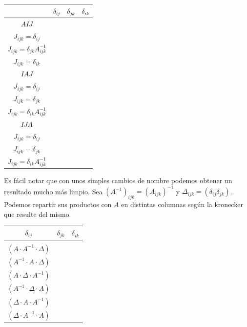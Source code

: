 \documentclass[a4paper, titlepage]{article}
\begin{document}
\begin{tabular}{ |c|c|c|c| } 
	\hline
		  & $\delta_{ij}$      & $\delta_{jk}$       & $\delta_{ik}$ \\
	\hline
	$AIJ$ & \makecell{$I_{ijk} = \delta_{ij} A_{ijk}^{-1}$ \\ $J_{ijk} = \delta_{ij}$}                          & \makecell{$I_{ijk} = \delta_{jk}$ \\ $J_{ijk} = \delta_{jk} A_{ijk}^{-1}$}                          & \makecell{$I_{ijk} = \delta_{ik} \sum\limits^n_{l=1}\delta_{il} A_{lll}^{-1}$ \\ $J_{ijk} = \delta_{ik}$} \\
	\hline
	$IAJ$ & \makecell{$I_{ijk} = \delta_{ij} A_{ijk}^{-1}$ \\ $J_{ijk} = \delta_{ij}$}                          & \makecell{$I_{ijk} = \delta_{jk} \sum\limits^n_{l=1} \delta_{jl} A_{lll}^{-1}$ \\ $J_{ijk} = \delta_{jk}$} & \makecell{$I_{ijk} = \delta_{ik}$ \\ $J_{ijk} = \delta_{ik} A_{ijk}^{-1}$} \\
	\hline
	$IJA$ & \makecell{$I_{ijk} = \delta_{ij} \sum\limits^n_{l=1} \delta_{il} A_{lll}^{-1}$ \\ $J_{ijk} = \delta_{ij}$} & \makecell{$I_{ijk} = \delta_{jk} A_{ijk}^{-1}$ \\ $J_{ijk} = \delta_{jk}$}                          & \makecell{$I_{ijk} = \delta_{ik}$ \\ $J_{ijk} = \delta_{ik} A_{ijk}^{-1}$} \\
	\hline
\end{tabular}

\vspace{0.5cm}

Es fácil notar que con unos simples cambios de nombre podemos obtener un resultado mucho más limpio. Sea $(A^{-1})_{ijk} = (A_{ijk})^{-1}$ y $\Delta_{ijk} = (\delta_{ij}\delta_{jk})$. Podemos repartir sus productos con $A$ en distintas columnas según la kronecker que resulte del mismo.

\vspace{0.5cm}
\begin{tabular}{ |c|c|c| } 
	\hline
	$\delta_{ij}$ & $\delta_{jk}$ & $\delta_{ik}$ \\
	\hline
	\makecell{$((\delta_{ij} A_{iii}^{-1}) \cdot (\delta_{ij}) \cdot A)$ \\ $(A \cdot A^{-1} \cdot \Delta)$ \\ $(A^{-1} \cdot A \cdot \Delta)$} &
	\makecell{$((\delta_{jk} A_{jjj}^{-1}) \cdot A \cdot (\delta_{jk}))$ \\ $(A \cdot \Delta \cdot A^{-1})$ \\ $(A^{-1} \cdot \Delta \cdot A)$} &
	\makecell{$(A \cdot (\delta_{ik} A_{kkk}^{-1}) \cdot (\delta_{ik}))$ \\ $(\Delta \cdot A \cdot A^{-1})$ \\ $(\Delta \cdot A^{-1} \cdot A)$} \\
	\hline
\end{tabular}
\vspace{0.5cm}
\end{document}
